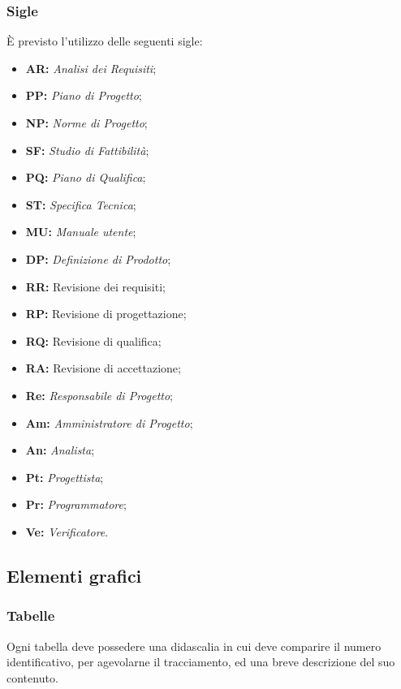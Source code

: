 \documentclass[./../NormediProgetto.tex]{subfiles}
\begin{document}
\subsubsection{Sigle}

È previsto l’utilizzo delle seguenti sigle: 

\begin{itemize}
\item{\textbf{AR:}} \textit{Analisi dei Requisiti};
\item{\textbf{PP:}} \textit{Piano di Progetto};
\item{\textbf{NP:}} \textit{Norme di Progetto};
\item{\textbf{SF:}} \textit{Studio di Fattibilità};
\item{\textbf{PQ:}} \textit{Piano di Qualifica};
\item{\textbf{ST:}} \textit{Specifica Tecnica};
\item{\textbf{MU:}} \textit{Manuale utente};
\item{\textbf{DP:}} \textit{Definizione di Prodotto};
\item{\textbf{RR:}} Revisione dei requisiti;
\item{\textbf{RP:}} Revisione di progettazione;
\item{\textbf{RQ:}} Revisione di qualifica;
\item{\textbf{RA:}} Revisione di accettazione;
\item{\textbf{Re:}} \textit{Responsabile di Progetto};
\item{\textbf{Am:}} \textit{Amministratore di Progetto};
\item{\textbf{An:}} \textit{Analista};
\item{\textbf{Pt:}} \textit{Progettista};
\item{\textbf{Pr:}} \textit{Programmatore};
\item{\textbf{Ve:}} \textit{Verificatore}.
\end{itemize}

\subsection{Elementi grafici}

\subsubsection{Tabelle}

Ogni tabella deve possedere una didascalia in cui deve comparire il numero identificativo, per agevolarne il tracciamento, ed una breve descrizione del suo contenuto.
\end{document}
